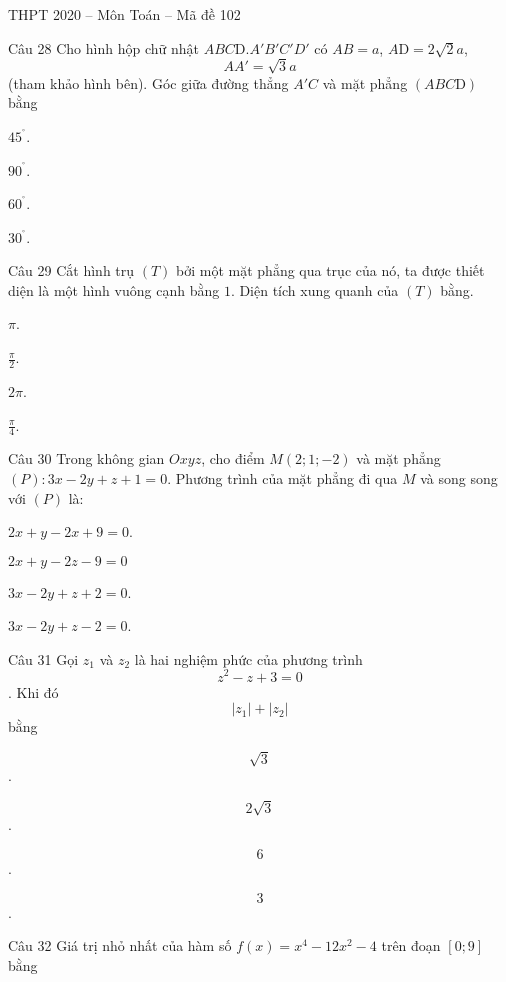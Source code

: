 \documentclass{book}
\begin{document}
\begin{quiz}{THPT 2020 – Môn Toán – Mã đề 102}
\begin{multi}[points=1]{Câu 28}
 Cho hình hộp chữ nhật $ABC\text{D}.A'B'C'D'$ có $AB=a$, $A\text{D}=2\sqrt{2}a$, \[AA'=\sqrt{3}a\] (tham khảo hình bên). Góc giữa đường thẳng $A'C$ và mặt phẳng $\left( ABC\text{D} \right)$ bằng

\item*  ${{45}^{{}^\circ }}$.	
\item  ${{90}^{{}^\circ }}$.	
\item  ${{60}^{{}^\circ }}$.	
\item  ${{30}^{{}^\circ }}$.
\end{multi}

\begin{multi}[points=1]{Câu 29}
 Cắt hình trụ $\left( T \right)$ bởi một mặt phẳng qua trục của nó, ta được thiết diện là một hình vuông cạnh bằng $1$. Diện tích xung quanh của $\left( T \right)$ bằng. 

\item*  $\pi $.	
\item  $\frac{\pi }{2}$.	
\item  $2\pi $.	
\item  $\frac{\pi }{4}$.
\end{multi}

\begin{multi}[points=1]{Câu 30}
 Trong không gian $Oxyz$, cho điểm $M\left( 2;1;-2 \right)$ và mặt phẳng $\left( P \right):3x-2y+z+1=0$. Phương trình của mặt phẳng đi qua $M$ và song song với $\left( P \right)$ là: 

\item  $2x+y-2x+9=0$.		
\item  $2x+y-2z-9=0$	
\item  $3x-2y+z+2=0$.		
\item*  $3x-2y+z-2=0$.
\end{multi}

\begin{multi}[points=1]{Câu 31}
 Gọi ${{z}_{1}}$ và ${{z}_{2}}$ là hai nghiệm phức của phương trình \[{{z}^{2}}-z+3=0\]. Khi đó \[\left| {{z}_{1}} \right|+\left| {{z}_{2}} \right|\] bằng

\item  \[\sqrt{3}\].	
\item*  \[2\sqrt{3}\].	
\item  \[6\].	
\item  \[3\].
\end{multi}

\begin{multi}[points=1]{Câu 32}
 Giá trị nhỏ nhất của hàm số $f\left( x \right)={{x}^{4}}-12{{x}^{2}}-4$ trên đoạn $\left[ 0;9 \right]$ bằng


\end{multi}
\end{quiz}
\end{document}
